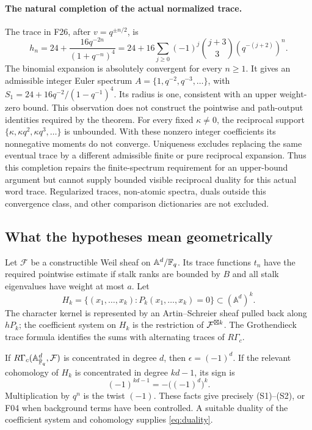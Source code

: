 \documentclass[11pt,a4paper]{article}
\newcommand{\A}{\mathbb A}\newcommand{\PP}{\mathbb P}\newcommand{\GL}{\mathrm{GL}}
\newcommand{\fid}[1]{\textsf{#1}}\newcommand{\gate}[1]{\textsf{#1}}
\theoremstyle{named}\newtheorem{finding}{Finding}[section]
\theoremstyle{definition}\newtheorem{definition}[finding]{Definition}
\theoremstyle{remark}\newtheorem{remark}[finding]{Remark}
\begin{document}
\paragraph{The natural completion of the actual normalized trace.}
The trace in \fid{F26}, after $v=q^{\pm n/2}$, is
\[
 h_n=24+\frac{16q^{-2n}}{(1+q^{-n})^4}
 =24+16\sum_{j\ge0}(-1)^j\binom{j+3}{3}
                   (q^{-(j+2)})^n.
\]
The binomial expansion is absolutely convergent for every $n\ge1$.
It gives an admissible integer Euler spectrum
$A=\{1,q^{-2},q^{-3},\ldots\}$, with
$S_1=24+16q^{-2}/(1-q^{-1})^4$. Its radius is one, consistent with
an upper weight-zero bound. This observation does not construct the
pointwise and path-output identities required by the theorem.
For every fixed $\kappa\ne0$, the reciprocal support
$\{\kappa,\kappa q^2,\kappa q^3,\ldots\}$ is unbounded.
With these nonzero integer coefficients its nonnegative moments do
not converge. Uniqueness excludes replacing the same eventual trace
by a different admissible finite or pure reciprocal expansion.
Thus this completion repairs the finite-spectrum requirement for an
upper-bound argument but cannot supply bounded visible reciprocal
duality for this actual word trace. Regularized traces, non-atomic
spectra, duals outside this convergence class, and other comparison
dictionaries are not excluded.

\subsection{What the hypotheses mean geometrically}\label{sec:tracegeom}
Let $\mathcal F$ be a constructible Weil sheaf on $\A^d/\F_q$. Its trace functions $t_n$ have the required pointwise estimate if stalk ranks are bounded by $B$ and all stalk eigenvalues have weight at most $a$. Let
\[
 H_k=\{(x_1,\ldots,x_k):P_k(x_1,\ldots,x_k)=0\}
 \subset(\A^d)^k.
\]
The character kernel is represented by an Artin--Schreier sheaf pulled back along $hP_k$; the coefficient system on $H_k$ is the restriction of $\mathcal F^{\boxtimes k}$. The Grothendieck trace formula identifies the sums with alternating traces of $R\Gamma_c$.

If $R\Gamma_c(\A^d_{\bar{\F}_q},\mathcal F)$ is concentrated in degree $d$, then $\epsilon=(-1)^d$. If the relevant cohomology of $H_k$ is concentrated in degree $kd-1$, its sign is
\[
 (-1)^{kd-1}=-\bigl((-1)^d\bigr)^k.
\]
Multiplication by $q^n$ is the twist $(-1)$. These facts give precisely (S1)--(S2), or \fid{F04} when background terms have been controlled. A suitable duality of the coefficient system and cohomology supplies \eqref{eq:duality}.
\end{document}

